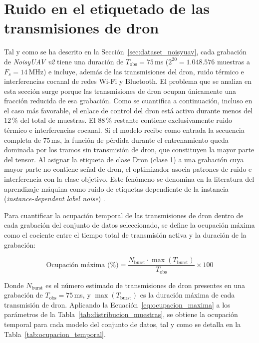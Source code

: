 \section{Ruido en el etiquetado de las transmisiones de dron}
\label{sec:label_noise}

Tal y como se ha descrito en la Sección~\ref{sec:dataset_noisyuav}, cada grabación de \textit{NoisyUAV v2} tiene una duración de $T_{\text{obs}} = 75$\,ms ($2^{20} = 1.048.576$ muestras a $F_s = 14$\,MHz) e incluye, además de las transmisiones del dron, ruido térmico e interferencias cocanal de redes Wi-Fi y Bluetooth. El problema que se analiza en esta sección surge porque las transmisiones de dron ocupan únicamente una fracción reducida de esa grabación. Como se cuantifica a continuación, incluso en el caso más favorable, el enlace de control del dron está activo durante menos del 12\,\% del total de muestras. El 88\,\% restante contiene exclusivamente ruido térmico e interferencias cocanal. Si el modelo recibe como entrada la secuencia completa de 75\,ms, la función de pérdida durante el entrenamiento queda dominada por los tramos sin transmisión de dron, que constituyen la mayor parte del tensor. Al asignar la etiqueta de clase Dron (clase 1) a una grabación cuya mayor parte no contiene señal de dron, el optimizador asocia patrones de ruido e interferencia con la clase objetivo. Este fenómeno se denomina en la literatura del aprendizaje máquina como ruido de etiquetas dependiente de la instancia (\textit{instance-dependent label noise}) \cite{frenay_classification_2014, song_learning_2022}.

Para cuantificar la ocupación temporal de las transmisiones de dron dentro de cada grabación del conjunto de datos seleccionado, se define la ocupación máxima como el cociente entre el tiempo total de transmisión activa y la duración de la grabación:

\begin{equation}
    \text{Ocupación máxima (\%)} = \frac{N_{\text{burst}} \cdot \max(T_{\text{burst}})}{T_{\text{obs}}} \times 100
    \label{eq:ocupacion_maxima}
\end{equation}

Donde $N_{\text{burst}}$ es el número estimado de transmisiones de dron presentes en una grabación de $T_{\text{obs}} = 75$\,ms, y $\max(T_{\text{burst}})$ es la duración máxima de cada transmisión de dron. Aplicando la Ecuación~\ref{eq:ocupacion_maxima} a los parámetros de la Tabla~\ref{tab:distribucion_muestras}, se obtiene la ocupación temporal para cada modelo del conjunto de datos, tal y como se detalla en la Tabla~\ref{tab:ocupacion_temporal}.

